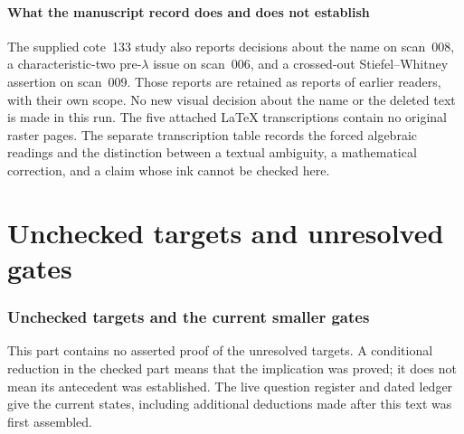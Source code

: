 \documentclass[11pt,a4paper]{article}
\theoremstyle{definition}\newtheorem{definition}{Definition}
\begin{document}
\subsection{What the manuscript record does and does not establish}
The supplied cote~133 study also reports decisions about the name on scan~008, a characteristic-two pre-$\lambda$ issue on scan~006, and a crossed-out Stiefel--Whitney assertion on scan~009. Those reports are retained as reports of earlier readers, with their own scope. No new visual decision about the name or the deleted text is made in this run. The five attached LaTeX transcriptions contain no original raster pages. The separate transcription table records the forced algebraic readings and the distinction between a textual ambiguity, a mathematical correction, and a claim whose ink cannot be checked here.

\part{Unchecked targets and unresolved gates}
\section{Unchecked targets and the current smaller gates}

This part contains no asserted proof of the unresolved targets. A conditional reduction in the checked part means that the implication was proved; it does not mean its antecedent was established. The live question register and dated ledger give the current states, including additional deductions made after this text was first assembled.
\end{document}
